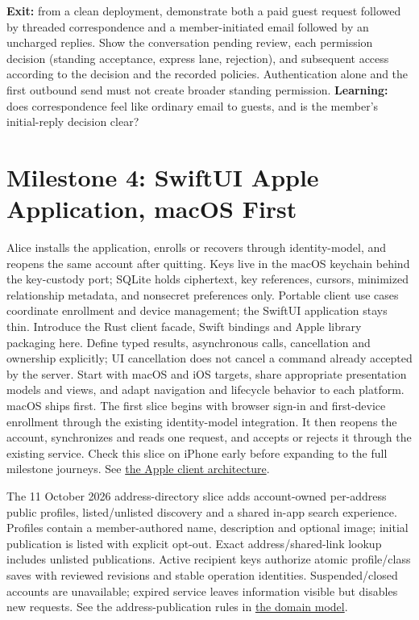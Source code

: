 \documentclass[11pt]{article}
\begin{document}
\textbf{Exit:} from a clean deployment, demonstrate both a paid guest request
followed by threaded correspondence and a member-initiated email followed by an
uncharged replies. Show the conversation pending review, each permission decision
(standing acceptance, express lane, rejection), and subsequent access according
to the decision and the recorded policies. Authentication alone and the first
outbound send must not create broader standing permission. \textbf{Learning:} does
correspondence feel like ordinary email to guests, and is the member's initial-reply
decision clear?

\section{Milestone 4: SwiftUI Apple Application, macOS First}

Alice installs the application, enrolls or recovers through identity-model, and
reopens the same account after quitting. Keys live in the macOS keychain behind
the key-custody port; SQLite holds ciphertext, key references, cursors, minimized
relationship metadata, and nonsecret preferences only. Portable client use cases
coordinate enrollment and device management; the SwiftUI application stays thin.
Introduce the Rust client facade, Swift bindings and Apple library packaging here.
Define typed results, asynchronous calls, cancellation and ownership explicitly;
UI cancellation does not cancel a command already accepted by the server.
Start with macOS and iOS targets, share appropriate presentation models and views,
and adapt navigation and lifecycle behavior to each platform. macOS ships first.
The first slice begins with browser sign-in and first-device enrollment through
the existing identity-model integration. It then reopens the account, synchronizes
and reads one request, and accepts or rejects it through the existing service.
Check this slice on iPhone early before expanding to the full milestone journeys. See
\href{docs/apple-client-architecture.md}{the Apple client architecture}.

The 11 October 2026 address-directory slice adds account-owned per-address public
profiles, listed/unlisted discovery and a shared in-app search experience. Profiles
contain a member-authored name, description and optional image; initial publication
is listed with explicit opt-out. Exact address/shared-link lookup includes unlisted
publications. Active recipient keys authorize atomic profile/class saves with reviewed
revisions and stable operation identities. Suspended/closed accounts are unavailable;
expired service leaves information visible but disables new requests. See the
address-publication rules in \href{DOMAIN_MODEL.md}{the domain model}.
\end{document}
